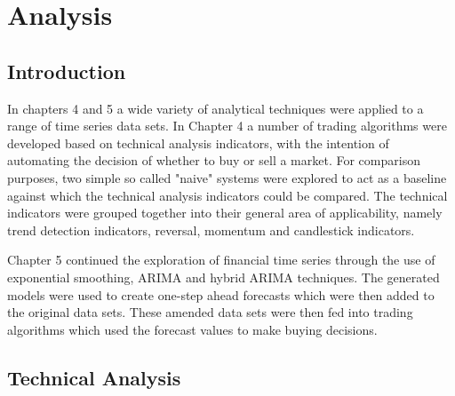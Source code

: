 
\chapter{Analysis} %

\label{Chapter6} %



\section{Introduction}
In chapters 4 and 5 a wide variety of analytical techniques were applied to a range of time series data sets. In Chapter 4 a number of trading algorithms were developed based on technical analysis indicators, with the intention of automating the decision of whether to buy or sell a market. For comparison purposes, two simple so called "naive" systems were explored to act as a baseline against which the technical analysis indicators could be compared.  The technical indicators were grouped together into their general area of applicability, namely trend detection indicators, reversal, momentum and candlestick indicators.

Chapter 5 continued the exploration of financial time series through the use of exponential smoothing, ARIMA and hybrid ARIMA techniques. The generated models were used to create one-step ahead forecasts which were then added to the original data sets. These amended data sets were then fed into trading algorithms which used the forecast values to make buying decisions.



\section{Technical Analysis}

%

%

%

%

